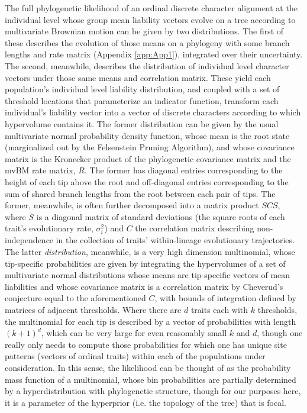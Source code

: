 The full phylogenetic likelihood of an ordinal discrete character alignment at the individual level whose group mean liability vectors evolve on a tree according to multivariate Brownian motion can be given by two distributions. The first of these describes the evolution of those means on a phylogeny with some branch lengths and rate matrix (Appendix \ref{app:App1}), integrated over their uncertainty. The second, meanwhile, describes the distribution of individual level character vectors under those same means and correlation matrix. These yield each population's individual level liability distribution, and coupled with a set of threshold locations that parameterize an indicator function, transform each individual's liability vector into a vector of discrete characters according to which hypervolume contains it. The former distribution can be given by the usual multivariate normal probability density function, whose mean is the root state (marginalized out by the Felsenstein Pruning Algorithm), and whose covariance matrix is the Kronecker product of the phylogenetic covariance matrix and the mvBM rate matrix, $R$. The former has diagonal entries corresponding to the height of each tip above the root and off-diagonal entries corresponding to the sum of shared branch lengths from the root between each pair of tips. The former, meanwhile, is often further  decomposed into a matrix product $SCS$, where $S$ is a diagonal matrix of standard deviations (the square roots of each trait's evolutionary rate, $\sigma^2_i$) and $C$ the correlation matrix describing non-independence in the collection of traits' within-lineage evolutionary trajectories. The latter \textit{distribution}, meanwhile, is a very high dimension multinomial, whose tip-specific probabilities are given by integrating the hypervolumes of a set of multivariate normal distributions whose means are tip-specific vectors of mean liabilities and whose covariance matrix is a correlation matrix by Cheverud's conjecture equal to the aforementioned $C$, with bounds of integration defined by matrices of adjacent thresholds. Where there are $d$ traits each with $k$ thresholds, the multinomial for each tip is described by a vector of probabilities with length $(k+1)^d$, which can be very large for even reasonably small $k$ and $d$, though one really only needs to compute those probabilities for which one has unique site patterns (vectors of ordinal traits) within each of the populations under consideration. In this sense, the likelihood can be thought of as the probability mass function of a multinomial, whose bin probabilities are partially determined by a hyperdistribution with phylogenetic structure, though for our purposes here, it is a parameter of the hyperprior (i.e. the topology of the tree) that is focal. 

